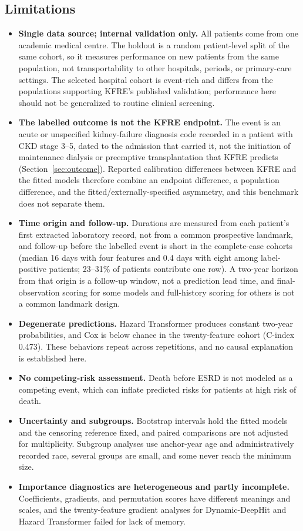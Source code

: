 \subsection{Limitations} \label{sec:limitations}

\begin{itemize}
    \item \textbf{Single data source; internal validation only.} All patients come from one academic medical centre. The holdout is a random patient-level split of the same cohort, so it measures performance on new patients from the same population, not transportability to other hospitals, periods, or primary-care settings. The selected hospital cohort is event-rich and differs from the populations supporting KFRE's published validation; performance here should not be generalized to routine clinical screening.
    \item \textbf{The labelled outcome is not the KFRE endpoint.} The event is an acute or unspecified kidney-failure diagnosis code recorded in a patient with CKD stage 3--5, dated to the admission that carried it, not the initiation of maintenance dialysis or preemptive transplantation that KFRE predicts (Section~\ref{sec:outcome}). Reported calibration differences between KFRE and the fitted models therefore combine an endpoint difference, a population difference, and the fitted/externally-specified asymmetry, and this benchmark does not separate them.
    \item \textbf{Time origin and follow-up.} Durations are measured from each patient's first extracted laboratory record, not from a common prospective landmark, and follow-up before the labelled event is short in the complete-case cohorts (median 16 days with four features and 0.4 days with eight among label-positive patients; 23--31\% of patients contribute one row). A two-year horizon from that origin is a follow-up window, not a prediction lead time, and final-observation scoring for some models and full-history scoring for others is not a common landmark design.
    \item \textbf{Degenerate predictions.} Hazard Transformer produces constant two-year probabilities, and Cox is below chance in the twenty-feature cohort (C-index 0.473). These behaviors repeat across repetitions, and no causal explanation is established here.
    \item \textbf{No competing-risk assessment.} Death before ESRD is not modeled as a competing event, which can inflate predicted risks for patients at high risk of death.
    \item \textbf{Uncertainty and subgroups.} Bootstrap intervals hold the fitted models and the censoring reference fixed, and paired comparisons are not adjusted for multiplicity. Subgroup analyses use anchor-year age and administratively recorded race, several groups are small, and some never reach the minimum size.
    \item \textbf{Importance diagnostics are heterogeneous and partly incomplete.} Coefficients, gradients, and permutation scores have different meanings and scales, and the twenty-feature gradient analyses for Dynamic-DeepHit and Hazard Transformer failed for lack of memory.
\end{itemize}

